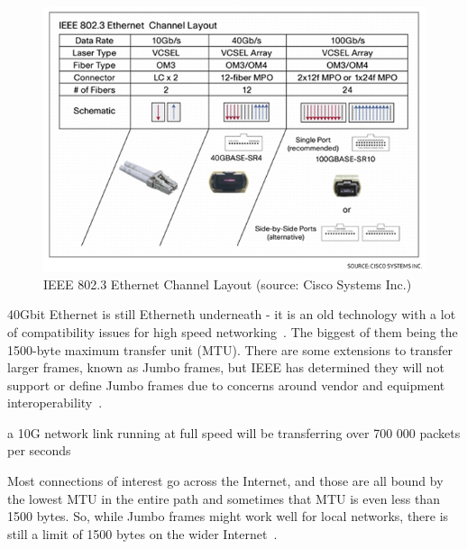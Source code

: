 \begin{figure}
	\centering
	\includegraphics[width=13cm,keepaspectratio]{fig/ethernet-layout.jpg}
	\caption{IEEE 802.3 Ethernet Channel Layout (source: Cisco Systems Inc.)}
	\label{fig:40gbit-ethernet-layout}
	\bigskip
\end{figure}


40Gbit Ethernet is still Etherneth underneath - it is an old technology
with a lot of compatibility issues for high speed networking~\cite{jls2009-gro}.
The biggest of them being the 1500-byte maximum transfer unit (MTU).
There are some extensions to transfer larger frames, known as Jumbo frames,
but IEEE has determined they will not support or define Jumbo frames
due to concerns around vendor and equipment interoperability~\cite{ethernetalliance-jumbo-frames}.


a 10G network link running at full speed will be transferring over 700 000 packets per seconds

Most connections of interest go across the Internet, and those are all bound by the lowest MTU in the entire path
and sometimes that MTU is even less than 1500 bytes.
So, while Jumbo frames might work well for local networks, there is still a limit of 1500 bytes on the wider Internet~\cite{jls2009-gro}.

